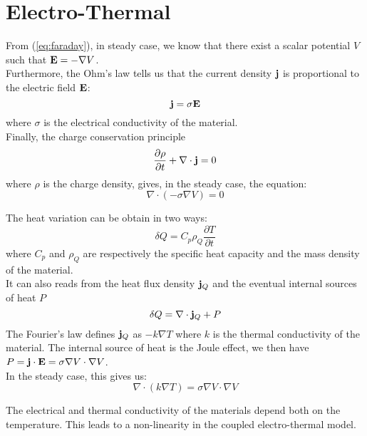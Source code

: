 \section{Electro-Thermal}
From (\ref{eq:faraday}), in steady case, we know that there exist a scalar
potential $V$ such that $\mathbf{E} = -\nabla V$.\\
Furthermore, the Ohm's law tells us that the current density $\mathbf{j}$ is
proportional to the electric field $\mathbf{E}$:
\begin{equation*}
  \mathbf{j} = \sigma\mathbf{E}
\end{equation*}
where $\sigma$ is the electrical conductivity of the material.\\
Finally, the charge conservation principle
\begin{equation*}
  \frac{\partial\rho}{\partial t} + \nabla\cdot\mathbf{j} = 0
\end{equation*}
where $\rho$ is the charge density, gives, in the steady case, the equation:
\begin{equation}
  \nabla\cdot(-\sigma\nabla V) = 0
\end{equation}

The heat variation can be obtain in two ways:
\begin{equation*}
  \delta Q = C_p\rho_Q\frac{\partial T}{\partial t}
\end{equation*}
where $C_p$ and $\rho_Q$ are respectively the specific heat capacity and the
mass density of the material.\\
It can also reads from the heat flux density $\mathbf{j}_Q$ and the eventual internal
sources of heat $P$
\begin{equation*}
  \delta Q = \nabla\cdot\mathbf{j}_Q + P
\end{equation*}
The Fourier's law defines $\mathbf{j}_Q$ as $-k\nabla T$ where $k$ is the thermal
conductivity of the material. The internal source of heat is the Joule effect,
we then have $P=\mathbf{j}\cdot\mathbf{E}=\sigma\nabla V\cdot\nabla V$.\\
In the steady case, this gives us:
\begin{equation}
  \nabla\cdot(k\nabla T) = \sigma\nabla V\cdot\nabla V
\end{equation}

The electrical and thermal conductivity of the materials depend both on the
temperature. This leads to a non-linearity in the coupled electro-thermal model.

